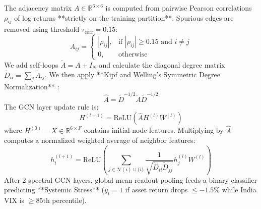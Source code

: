 \documentclass[10pt,twocolumn,letterpaper]{article}
\begin{document}
The adjacency matrix $A \in \mathbb{R}^{6 \times 6}$ is computed from pairwise Pearson correlations $\rho_{ij}$ of log returns **strictly on the training partition**. Spurious edges are removed using threshold $\tau_{\text{corr}} = 0.15$:
\begin{equation}
    A_{ij} = \begin{cases} |\rho_{ij}|, & \text{if } |\rho_{ij}| \ge 0.15 \text{ and } i \neq j \\ 0, & \text{otherwise} \end{cases}
\end{equation}
We add self-loops $\tilde{A} = A + I_N$ and calculate the diagonal degree matrix $\tilde{D}_{ii} = \sum_j \tilde{A}_{ij}$. We then apply **Kipf and Welling's Symmetric Degree Normalization** \cite{kipf2016semi}:
\begin{equation}
    \hat{A} = \tilde{D}^{-1/2} \tilde{A} \tilde{D}^{-1/2}
\end{equation}
The GCN layer update rule is:
\begin{equation}
    H^{(l+1)} = \text{ReLU}\left(\hat{A} H^{(l)} W^{(l)}\right)
\end{equation}
where $H^{(0)} = X \in \mathbb{R}^{6 \times F}$ contains initial node features. Multiplying by $\hat{A}$ computes a normalized weighted average of neighbor features:
\begin{equation}
    h_i^{(l+1)} = \text{ReLU}\left(\sum_{j \in \mathcal{N}(i) \cup \{i\}} \frac{1}{\sqrt{\tilde{D}_{ii}\tilde{D}_{jj}}} h_j^{(l)} W^{(l)}\right)
\end{equation}
After 2 spectral GCN layers, global mean readout pooling feeds a binary classifier predicting **Systemic Stress** ($y_t = 1$ if asset return drops $\le -1.5\%$ while India VIX is $\ge 85\text{th}$ percentile).
\end{document}
